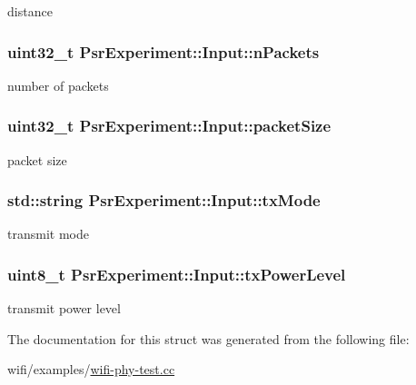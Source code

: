 distance 

\subsubsection[{\texorpdfstring{n\+Packets}{nPackets}}]{\setlength{\rightskip}{0pt plus 5cm}uint32\+\_\+t Psr\+Experiment\+::\+Input\+::n\+Packets}\hypertarget{structPsrExperiment_1_1Input_a0cc62b12bc4eef09883bcd12414fc09b}{}\label{structPsrExperiment_1_1Input_a0cc62b12bc4eef09883bcd12414fc09b}


number of packets 

\subsubsection[{\texorpdfstring{packet\+Size}{packetSize}}]{\setlength{\rightskip}{0pt plus 5cm}uint32\+\_\+t Psr\+Experiment\+::\+Input\+::packet\+Size}\hypertarget{structPsrExperiment_1_1Input_ae43b0fd5bf26ec81497ee109183ec771}{}\label{structPsrExperiment_1_1Input_ae43b0fd5bf26ec81497ee109183ec771}


packet size 

\subsubsection[{\texorpdfstring{tx\+Mode}{txMode}}]{\setlength{\rightskip}{0pt plus 5cm}std\+::string Psr\+Experiment\+::\+Input\+::tx\+Mode}\hypertarget{structPsrExperiment_1_1Input_a2d2c2e64976db022d21b26e8c0897846}{}\label{structPsrExperiment_1_1Input_a2d2c2e64976db022d21b26e8c0897846}


transmit mode 

\subsubsection[{\texorpdfstring{tx\+Power\+Level}{txPowerLevel}}]{\setlength{\rightskip}{0pt plus 5cm}uint8\+\_\+t Psr\+Experiment\+::\+Input\+::tx\+Power\+Level}\hypertarget{structPsrExperiment_1_1Input_ac1d2b3dc5b6b3291a888af9aef549e86}{}\label{structPsrExperiment_1_1Input_ac1d2b3dc5b6b3291a888af9aef549e86}


transmit power level 



The documentation for this struct was generated from the following file\+:\begin{DoxyCompactItemize}
\item 
wifi/examples/\hyperlink{wifi-phy-test_8cc}{wifi-\/phy-\/test.\+cc}\end{DoxyCompactItemize}
